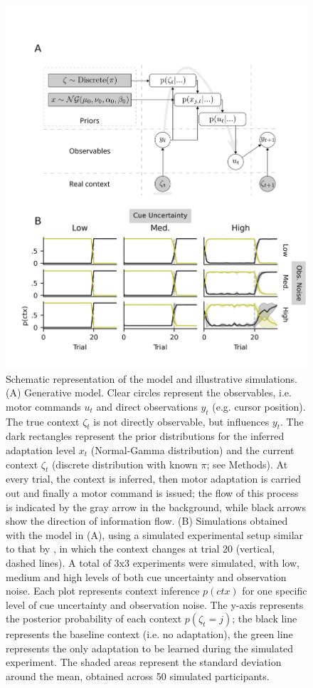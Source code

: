 \documentclass[a4paper,doc,floatsintext,natbib]{apa6}
\begin{document}
\begin{figure}
\centering
\includegraphics[]{./figures/figure_1.png}
\caption{Schematic representation of the model and illustrative simulations. (A) Generative model. Clear circles represent the observables, i.e. motor commands $u_t$ and direct observations $y_t$ (e.g. cursor position). The true context $\zeta_t$ is not directly observable, but influences $y_t$. The dark rectangles represent the prior distributions for the inferred adaptation level $x_t$ (Normal-Gamma distribution) and the current context $\zeta_t$ (discrete distribution with known $\pi$; see Methods). At every trial, the context is inferred, then motor adaptation is carried out and finally a motor command is issued; the flow of this process is indicated by the gray arrow in the background, while black arrows show the direction of information flow. (B) Simulations obtained with the model in (A), using a simulated experimental setup similar to that by \cite{Davidson_Scaling_2004}, in which the context changes at trial 20 (vertical, dashed lines). A total of 3x3 experiments were simulated, with low, medium and high levels of both cue uncertainty and observation noise. Each plot represents context inference $p(ctx)$ for one specific level of cue uncertainty and observation noise. The y-axis represents the posterior probability of each context $p(\zeta_t = j)$; the black line represents the baseline context (i.e. no adaptation), the green line represents the only adaptation to be learned during the simulated experiment. The shaded areas represent the standard deviation around the mean, obtained across 50 simulated participants.}
\label{fig:model}
\end{figure}
\end{document}
